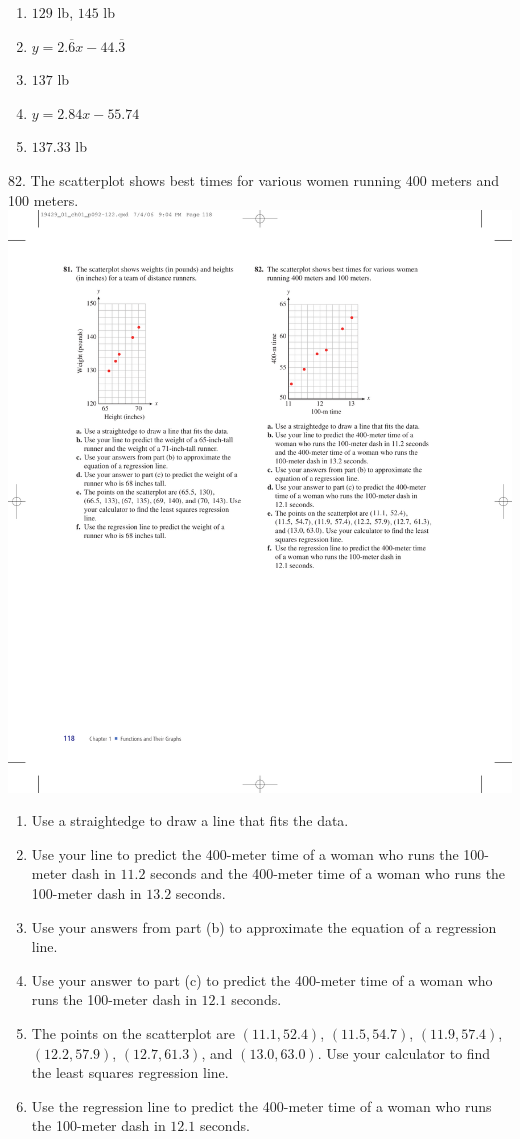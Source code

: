 \documentclass[10pt,]{book}
\theoremstyle{plain}
\theoremstyle{definition}
\theoremstyle{definition}
\theoremstyle{definition}
\theoremstyle{definition}
\numberwithin{equation}{part}
\begin{document}
\begin{exerciselist}
\begin{multicols}{2}
\begin{enumerate}[label=*\alph**]
%
\item\hypertarget{li-1669}{}\(129\) lb, \(145\) lb%
\item\hypertarget{li-1670}{}\(y = 2.\overline{6} x - 44.\overline{3}\)%
\item\hypertarget{li-1671}{}\(137\) lb%
\item\hypertarget{li-1672}{}\(y=2.84x - 55.74\)%
\item\hypertarget{li-1673}{}\(137.33\) lb%
\end{enumerate}
\end{multicols}
%
\item[82.]\hypertarget{exercise-478}{}The scatterplot shows best times for various women running 400 meters and 100 meters. \includegraphics[width=0.45\linewidth]{images/fig-chap1-rev-82}
 \leavevmode%
\begin{enumerate}[label=*\alph**]
\item\hypertarget{li-1674}{}Use a straightedge to draw a line that fits the data.%
\item\hypertarget{li-1675}{}Use your line to predict the 400-meter time of a woman who runs the 100-meter dash in \(11.2\) seconds and the 400-meter time of a woman who runs the 100-meter dash in \(13.2\) seconds.%
\item\hypertarget{li-1676}{}Use your answers from part (b) to approximate the equation of a regression line.%
\item\hypertarget{li-1677}{}Use your answer to part (c) to predict the 400-meter time of a woman who runs the 100-meter dash in \(12.1\) seconds.%
\item\hypertarget{li-1678}{}The points on the scatterplot are \((11.1, 52.4)\), \((11.5, 54.7)\), \((11.9, 57.4)\), \((12.2, 57.9)\), \((12.7, 61.3)\), and \((13.0, 63.0)\). Use your calculator to find the least squares regression line.%
\item\hypertarget{li-1679}{}Use the regression line to predict the 400-meter time of a woman who runs the 100-meter dash in \(12.1\) seconds.%

\end{enumerate}
\end{exerciselist}
\end{document}

